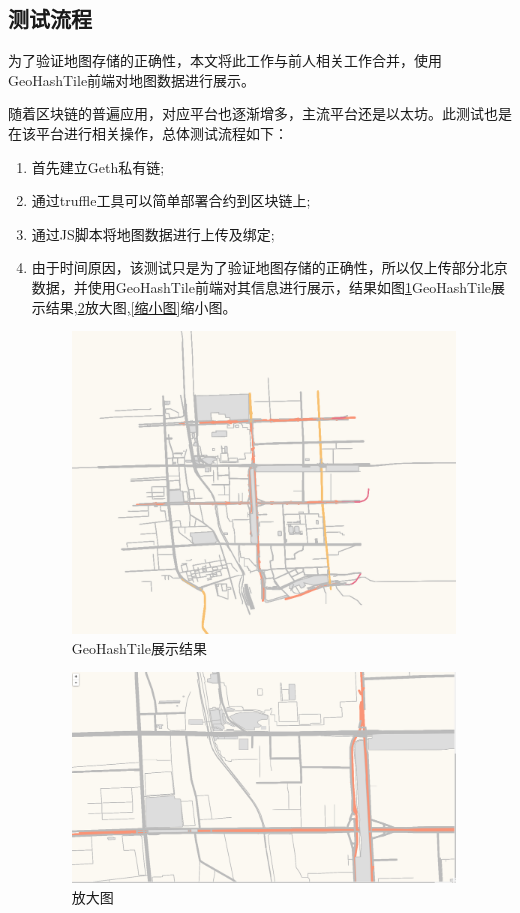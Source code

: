\subsection{测试流程}
为了验证地图存储的正确性，本文将此工作与前人相关工作合并，使用GeoHashTile前端对地图数据进行展示。

随着区块链的普遍应用，对应平台也逐渐增多，主流平台还是以太坊。此测试也是在该平台进行相关操作，总体测试流程如下：

\begin{enumerate}
    \item 首先建立Geth私有链;
    \item 通过truffle工具可以简单部署合约到区块链上;
    \item 通过JS脚本将地图数据进行上传及绑定;
    \item 由于时间原因，该测试只是为了验证地图存储的正确性，所以仅上传部分北京数据，并使用GeoHashTile前端对其信息进行展示，结果如图\ref{GeoHashTile展示结果}GeoHashTile展示结果,\ref{放大图}放大图,\ref{缩小图}缩小图。
    \begin{figure}[!htb]
        \centering
        \includegraphics[width=4in]{images/6.png}
        \caption{GeoHashTile展示结果}\label{GeoHashTile展示结果} %
    \end{figure}

    \begin{figure}[!htb]
        \centering
        \includegraphics[width=4in]{images/11.png}
        \caption{放大图}\label{放大图} %
    \end{figure}


\end{enumerate}
